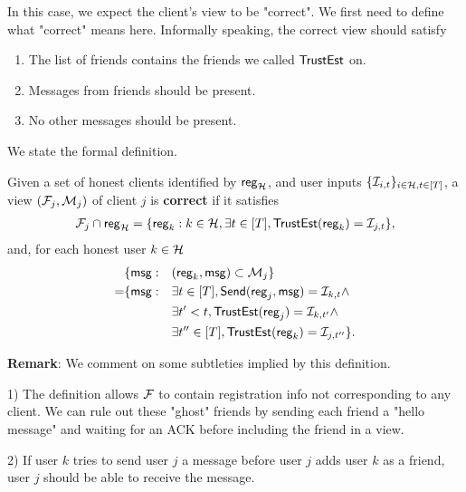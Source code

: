 
In this case, we expect the client's view to be "correct". We first need to define what "correct" means here. Informally speaking, the correct view should satisfy
\begin{enumerate}
    \item The list of friends contains the friends we called $\mathsf{TrustEst}$ on.         
    \item Messages from friends should be present.  
    \item No other messages should be present. 
\end{enumerate}
We state the formal definition.
\begin{definition}
\label{defn:client-view-correct}
Given a set of honest clients identified by $\mathsf{reg}_{\mathcal{H}}$, and user inputs $\{\mathcal{I}_{i, t}\}_{i \in \mathcal{H}, t \in [T]}$, a view $(\mathcal{F}_j, \mathcal{M}_j)$ of client $j$ is \textbf{correct} if it satisfies
\begin{multline*}
\mathcal{F}_j \cap \mathsf{reg}_{\mathcal{H}} = \{\mathsf{reg}_k: k \in \mathcal{H}, \exists t \in [T], \mathsf{TrustEst}(\mathsf{reg}_k) = \mathcal{I}_{j, t}\},    
\end{multline*}
and, for each honest user $k \in \mathcal{H}$
\begin{align*}
     &\{\mathsf{msg}: &&(\mathsf{reg}_k, \mathsf{msg}) \subset \mathcal{M}_j\} \\
      =& \{\mathsf{msg}: &&\exists t \in [T], \mathsf{Send}(\mathsf{reg}_j, \mathsf{msg}) = \mathcal{I}_{k, t} \land \\
          &   &&\exists t' < t, \mathsf{TrustEst}(\mathsf{reg}_j) = \mathcal{I}_{k, t'} \land \\
          &   &&\exists t'' \in [T], \mathsf{TrustEst}(\mathsf{reg}_k) = \mathcal{I}_{j, t''}\}.
\end{align*}
\end{definition}
\textbf{Remark}: We comment on some subtleties implied by this definition.

1) The definition allows $\mathcal{F}$ to contain registration info not corresponding to any client. We can rule out these "ghost" friends by sending each friend a "hello message" and waiting for an ACK before including the friend in a view. 

2) If user $k$ tries to send user $j$ a message before user $j$ adds user $k$ as a friend, user $j$ should be able to receive the message.


